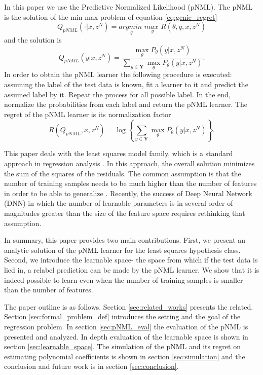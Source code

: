\documentclass[conference,letterpaper]{IEEEtran}
\def\pNMLSingle{\max_{\theta} P_\theta (y|x, z^N)}
\begin{document}
In this paper we use the Predictive Normalized Likelihood (pNML). The pNML is the solution of the min-max problem of equation \ref{eq:genie_regret} \cite{shtar1987universal}
\begin{equation} \label{eq:minmax_prob}
Q_{\textit{pNML}}(\cdot|x,z^N) = \underset{q}{\textit{argmin }}\underset{y}{\textit{max }} R(\theta, q, x, z^N)
\end{equation}
and the solution is 
\begin{equation} \label{eq:pNML}
Q_{pNML}(y|x,z^N)=\frac{\pNMLSingle}{\sum_{y\in \mathbf{Y}} \pNMLSingle}.
\end{equation}
In order to obtain the pNML learner the following procedure is executed:  assuming the label of the test data is known, fit a learner to it and predict the assumed label by it. 
Repeat the process for all possible label. 
In the end, normalize the probabilities from each label and return the pNML learner.
The regret of the pNML learner is its normalization factor
\begin{equation} \label{eq:pNML_regret}
R(Q_{\textit{pNML}}, x, z^N) = \log \left\{ \sum_{y\in \mathbf{Y}} \pNMLSingle \right\}.
\end{equation}

This paper deals with the least squares model family, which is a standard approach in regression analysis \cite{lawson1995solving}. 
In this approach, the overall solution minimizes the sum of the squares of the residuals. The common assumption is that the number of training samples needs to be much higher than the number of features in order to be able to generalize \cite{james2013introduction}.
Recently, the success of Deep Neural Network (DNN) in which the number of learnable parameters is in several order of magnitudes greater than the size of the feature space requires rethinking that assumption.

In summary, this paper provides two main contributions.
First, we present an analytic solution of the pNML learner for the least squares hypothesis class. Second, we introduce the learnable space- the space from which if the test data is lied in, a relabel prediction can be made by the pNML learner. We show that it is indeed possible to learn even when the number of training samples is smaller than the number of features.

The paper outline is as follows.
Section \ref{sec:related_works} presents the related. Section \ref{sec:formal_problem_def} introduces the setting and the goal of the regression problem. In section \ref{sec:pNML_eval} the evaluation of the pNML is presented and analyzed. In depth evaluation of the learnable space is shown in section \ref{sec:learnable_space}. The simulation of the pNML and its regret on estimating polynomial coefficients is shown in section \ref{sec:simulation} and the conclusion and future work is in section \ref{sec:conclusion}.
\end{document}
